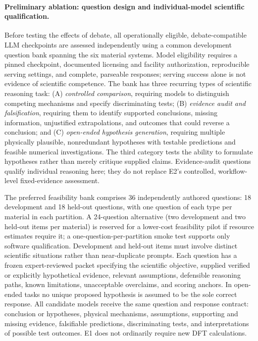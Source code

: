 \documentclass[11pt,a4paper]{article}
\begin{document}
\paragraph{Preliminary ablation: question design and individual-model scientific qualification.}
Before testing the effects of debate, all operationally eligible, debate-compatible LLM checkpoints are assessed independently using a common development question bank spanning the six material systems. Model eligibility requires a pinned checkpoint, documented licensing and facility authorization, reproducible serving settings, and complete, parseable responses; serving success alone is not evidence of scientific competence. The bank has three recurring types of scientific reasoning task: (A) \emph{controlled comparison}, requiring models to distinguish competing mechanisms and specify discriminating tests; (B) \emph{evidence audit and falsification}, requiring them to identify supported conclusions, missing information, unjustified extrapolations, and outcomes that could reverse a conclusion; and (C) \emph{open-ended hypothesis generation}, requiring multiple physically plausible, nonredundant hypotheses with testable predictions and feasible numerical investigations. The third category tests the ability to formulate hypotheses rather than merely critique supplied claims. Evidence-audit questions qualify individual reasoning here; they do not replace E2's controlled, workflow-level fixed-evidence assessment.

The preferred feasibility bank comprises 36 independently authored questions: 18 development and 18 held-out questions, with one question of each type per material in each partition. A 24-question alternative (two development and two held-out items per material) is reserved for a lower-cost feasibility pilot if resource estimates require it; a one-question-per-partition smoke test supports only software qualification. Development and held-out items must involve distinct scientific situations rather than near-duplicate prompts. Each question has a frozen expert-reviewed packet specifying the scientific objective, supplied verified or explicitly hypothetical evidence, relevant assumptions, defensible reasoning paths, known limitations, unacceptable overclaims, and scoring anchors. In open-ended tasks no unique proposed hypothesis is assumed to be the sole correct response. All candidate models receive the same question and response contract: conclusion or hypotheses, physical mechanisms, assumptions, supporting and missing evidence, falsifiable predictions, discriminating tests, and interpretations of possible test outcomes. E1 does not ordinarily require new DFT calculations.
\end{document}
